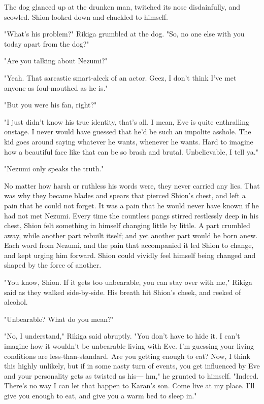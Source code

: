 The dog glanced up at the drunken man, twitched its nose disdainfully,
and scowled. Shion looked down and chuckled to himself.

"What's his problem?" Rikiga grumbled at the dog. "So, no one else with
you today apart from the dog?"

"Are you talking about Nezumi?"

"Yeah. That sarcastic smart-aleck of an actor. Geez, I don't think I've
met anyone as foul-mouthed as he is."

"But you were his fan, right?"

"I just didn't know his true identity, that's all. I mean, Eve is quite
enthralling onstage. I never would have guessed that he'd be such an
impolite asshole. The kid goes around saying whatever he wants, whenever
he wants. Hard to imagine how a beautiful face like that can be so brash
and brutal. Unbelievable, I tell ya."

"Nezumi only speaks the truth."

No matter how harsh or ruthless his words were, they never carried any
lies. That was why they became blades and spears that pierced Shion's
chest, and left a pain that he could not forget. It was a pain that he
would never have known if he had not met Nezumi. Every time the
countless pangs stirred restlessly deep in his chest, Shion felt
something in himself changing little by little. A part crumbled away,
while another part rebuilt itself; and yet another part would be born
anew. Each word from Nezumi, and the pain that accompanied it led Shion
to change, and kept urging him forward. Shion could vividly feel himself
being changed and shaped by the force of another.

"You know, Shion. If it gets too unbearable, you can stay over with me,"
Rikiga said as they walked side-by-side. His breath hit Shion's cheek,
and reeked of alcohol.

"Unbearable? What do you mean?"

"No, I understand," Rikiga said abruptly. "You don't have to hide it. I
can't imagine how it wouldn't be unbearable living with Eve. I'm
guessing your living conditions are less-than-standard. Are you getting
enough to eat? Now, I think this highly unlikely, but if in some nasty
turn of events, you get influenced by Eve and your personality gets as
twisted as his― hm," he grunted to himself. "Indeed. There's no way I
can let that happen to Karan's son. Come live at my place. I'll give you
enough to eat, and give you a warm bed to sleep in."

